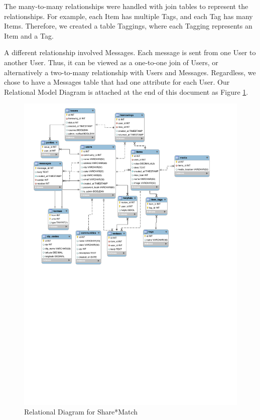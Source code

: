 \documentclass{acm_proc_article-sp}
\begin{document}
The many-to-many relationships were handled with join tables to represent the relationships. For example, each Item has multiple Tags, and each Tag has many Items. Therefore, we created a table Taggings, where each Tagging represents an Item and a Tag.

A different relationship involved Messages. Each message is sent from one User to another User. Thus, it can be viewed as a one-to-one join of Users, or alternatively a two-to-many relationship with Users and Messages. Regardless, we chose to have a Messages table that had one attribute for each User.
Our Relational Model Diagram is attached at the end of this document as Figure \ref{fig:RelationalDiagram}.
\begin{figure}[p]
    \includegraphics[width=\textwidth]{EECS341Relational.pdf}
    \caption{Relational Diagram for Share*Match}
    \label{fig:RelationalDiagram}
\end{figure}
\end{document}
